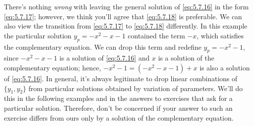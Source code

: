 \documentclass{ximera}
\begin{document}
There's nothing \textit{wrong} with leaving the general solution of
\eqref{eq:5.7.16} in the form \eqref{eq:5.7.17};     however, we think
you'll agree that \eqref{eq:5.7.18} is preferable. We can also view the
transition from \eqref{eq:5.7.17} to \eqref{eq:5.7.18} differently. In
this example the particular solution $y_p=-x^2-x-1$ contained the term
$-x$, which satisfies the complementary equation. We can
 drop this term and redefine $y_p=-x^2-1$, since
 $-x^2-x-1$ is a solution of \eqref{eq:5.7.16} and $x$ is a solution
of the complementary equation; hence, $-x^2-1=(-x^2-x-1)+x$
is also a solution of \eqref{eq:5.7.16}. In general, it's always
legitimate to drop linear combinations of $\{y_1,y_2\}$ from
particular solutions obtained by variation of parameters. 
We'll do this in the following  examples and in the answers to
exercises that ask  for a particular solution. Therefore, don't be
concerned if your answer to such an exercise differs from ours only by
a solution of the complementary equation.
\end{document}
